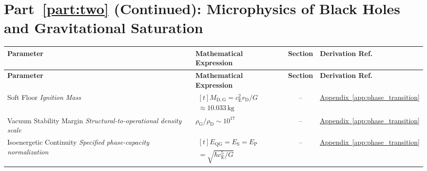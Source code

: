 \par\ifdim\dimexpr\pagegoal-\pagetotal\relax<12\baselineskip\newpage\fi
\section*{Part~\ref{part:two} (Continued): Microphysics of Black Holes and Gravitational Saturation}

\vspace{0.5cm}
\noindent
\begin{longtable}{@{} p{4.5cm} p{6cm} c p{4cm} @{}}
\toprule
\textbf{Parameter} & \textbf{Mathematical Expression} & \textbf{Section} & \textbf{Derivation Ref.} \\
\midrule
\endfirsthead
\toprule
\textbf{Parameter} & \textbf{Mathematical Expression} & \textbf{Section} & \textbf{Derivation Ref.} \\
\midrule
\endhead

{\raggedright Soft Floor \newline \textit{Ignition Mass}\par} & {\raggedright $\begin{gathered}[t]M_{\mathrm{D,G}}=c_{\mathrm E}^2r_{\mathrm D}/G \\ \approx10.033\,\mathrm{kg}\end{gathered}$\par} & -- & {\raggedright \hyperref[app:phase_transition]{Appendix~\ref*{app:phase_transition}}\par} \\

{\raggedright Vacuum Stability Margin \newline \textit{Structural-to-operational density scale}\par} & {\raggedright $\rho_{\mathrm G}/\rho_{\mathrm D}\sim10^{17}$\par} & -- & {\raggedright \hyperref[app:phase_transition]{Appendix~\ref*{app:phase_transition}}\par} \\

{\raggedright Isoenergetic Continuity \newline \textit{Specified phase-capacity normalization}\par} & {\raggedright $\begin{gathered}[t]E_{\mathrm{QG}}=E_{\mathrm S}=E_{\mathrm P} \\ =\sqrt{\hbar c_{\mathrm E}^5/G}\end{gathered}$\par} & -- & {\raggedright \hyperref[app:phase_transition]{Appendix~\ref*{app:phase_transition}}\par} \\


\end{longtable}

